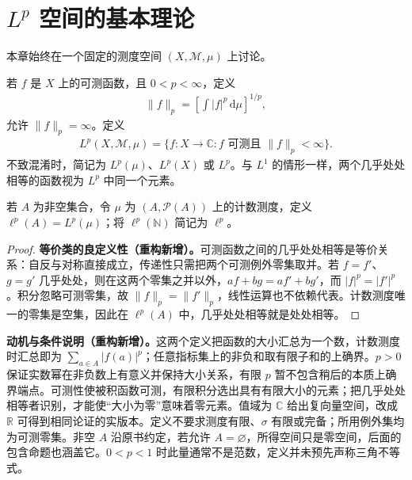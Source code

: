\documentclass[../../main.tex]{subfiles}
\begin{document}
\section{$L^p$ 空间的基本理论}\label{section:ch06-lp-basic}
本章始终在一个固定的测度空间 $(X,\mathscr M,\mu)$ 上讨论。
\begin{definition}[$L^p$ 空间]\label{definition:ch06-lp}
若 $f$ 是 $X$ 上的可测函数，且 $0<p<\infty$，定义
\begin{align*}
\|f\|_p=\left[\int|f|^p\,\mathrm d\mu\right]^{1/p},
\end{align*}
允许 $\|f\|_p=\infty$。定义
\begin{align*}
L^p(X,\mathscr M,\mu)=\{f:X\to\mathbb C:f\text{ 可测且 }\|f\|_p<\infty\}.
\end{align*}
不致混淆时，简记为 $L^p(\mu)$、$L^p(X)$ 或 $L^p$。与 $L^1$ 的情形一样，两个几乎处处相等的函数视为 $L^p$ 中同一个元素。
\end{definition}
\begin{definition}[$\ell^p$ 空间]\label{definition:ch06-little-lp}
若 $A$ 为非空集合，令 $\mu$ 为 $(A,\mathscr P(A))$ 上的计数测度，定义 $\ell^p(A)=L^p(\mu)$；将 $\ell^p(\mathbb N)$ 简记为 $\ell^p$。
\end{definition}
\begin{proof}
\textbf{等价类的良定义性（重构新增）。}可测函数之间的几乎处处相等是等价关系：自反与对称直接成立，传递性只需把两个可测例外零集取并。若 $f=f'$、$g=g'$ 几乎处处，则在这两个零集之并以外，$af+bg=af'+bg'$，而 $|f|^p=|f'|^p$。积分忽略可测零集，故 $\|f\|_p=\|f'\|_p$，线性运算也不依赖代表。计数测度唯一的零集是空集，因此在 $\ell^p(A)$ 中，几乎处处相等就是处处相等。
\end{proof}
\begin{remark}
\textbf{动机与条件说明（重构新增）。}这两个定义把函数的大小汇总为一个数，计数测度时汇总即为 $\sum_{a\in A}|f(a)|^p$；任意指标集上的非负和取有限子和的上确界。$p>0$ 保证实数幂在非负数上有意义并保持大小关系，有限 $p$ 暂不包含稍后的本质上确界端点。可测性使被积函数可测，有限积分选出具有有限大小的元素；把几乎处处相等者识别，才能使“大小为零”意味着零元素。值域为 $\mathbb C$ 给出复向量空间，改成 $\mathbb R$ 可得到相同论证的实版本。定义不要求测度有限、$\sigma$ 有限或完备；所用例外集均为可测零集。非空 $A$ 沿原书约定，若允许 $A=\varnothing$，所得空间只是零空间，后面的包含命题也涵盖它。$0<p<1$ 时此量通常不是范数，定义并未预先声称三角不等式。
\end{remark}
\end{document}

